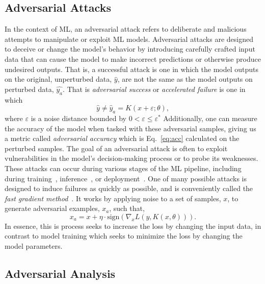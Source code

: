 \documentclass[sn-mathphys-num]{sn-jnl}%
\begin{document}
\subsection{Adversarial Attacks}
\label{attacks}
In the context of ML, an adversarial attack refers to deliberate and malicious attempts to manipulate or exploit ML models. Adversarial attacks are designed to deceive or change the model's behavior by introducing carefully crafted input data that can cause the model to make incorrect predictions or otherwise produce undesired outputs. That is, a successful attack is one in which the model outputs on the original, unperturbed data, $\hat{y}$, are not the same as the model outputs on perturbed data, $\hat{y_a}$. That is \textit{adversarial success} or \textit{accelerated failure} is one in which
\begin{equation}
    \hat{y} \neq \hat{y}_a = K(x + \varepsilon; \theta ) ,
\label{eq:adv_success}
\end{equation}
where $\varepsilon$ is a noise distance bounded by $0 < \varepsilon \leq \varepsilon^*$
Additionally, one can measure the accuracy of the model when tasked with these adversarial samples, giving us a metric called \textit{adversarial accuracy} which is Eq.~\ref{eq:acc} calculated on the perturbed samples. The goal of an adversarial attack is often to exploit vulnerabilities in the model's decision-making process or to probe its weaknesses. These attacks can occur during various stages of the ML pipeline, including during training~\cite{biggio_poisoning_2013, saha2020hidden}, inference~\cite{chakraborty_adversarial_2018, orekondy2019knockoff}, or deployment~\cite{chakraborty_adversarial_2018,choquette2021label,li2021membership,carlini_towards_2017,adversarialpatch, pixelattack,hopskipjump}.
One of many possible attacks is designed to induce failures as quickly as possible, and is  conveniently called the \textit{fast gradient method}~\cite{fgm}. It works by applying noise to a set of samples, $x$, to generate adversarial examples, $x_a$, such that,
\begin{equation}
x_a = x + \eta \cdot \mathrm{sign}(\nabla_x L(y, K(x, \theta))).
\label{eq:fgm}
\end{equation}
In essence, this is process seeks to increase the loss by changing the input data, in contrast to model training which seeks to minimize the loss by changing the model parameters.


\subsection{Adversarial Analysis}
\end{document}
